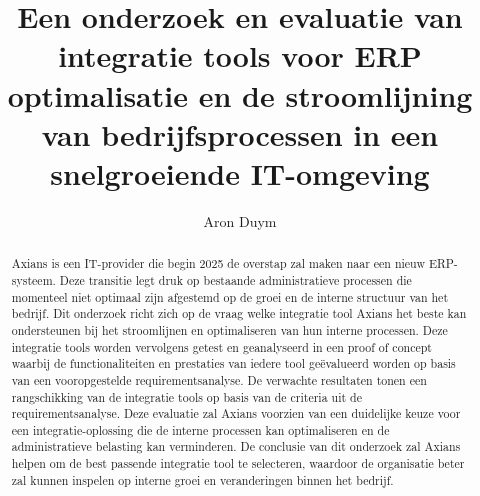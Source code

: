 \documentclass[a0,portrait]{hogent-poster}
\title{Een onderzoek en evaluatie van integratie tools voor ERP optimalisatie en de stroomlijning van bedrijfsprocessen in een snelgroeiende IT-omgeving}
\author{Aron Duym}
\begin{document}
\maketitle

\begin{abstract}
Axians is een IT-provider die begin 2025 de overstap zal maken naar een nieuw ERP-systeem. Deze transitie legt druk op bestaande administratieve processen die momenteel niet optimaal zijn afgestemd op de groei en de interne structuur van het bedrijf. Dit onderzoek richt zich op de vraag welke integratie tool Axians het beste kan ondersteunen bij het stroomlijnen en optimaliseren van hun interne processen. Deze integratie tools worden vervolgens getest en geanalyseerd in een proof of concept waarbij de functionaliteiten en prestaties van iedere tool geëvalueerd worden op basis van een vooropgestelde requirementsanalyse. De verwachte resultaten tonen een rangschikking van de integratie tools op basis van de criteria uit de requirementsanalyse. Deze evaluatie zal Axians voorzien van een duidelijke keuze voor een integratie-oplossing die de interne processen kan optimaliseren en de administratieve belasting kan verminderen. De conclusie van dit onderzoek zal Axians helpen om de best passende integratie tool te selecteren, waardoor de organisatie beter zal kunnen inspelen op interne groei en veranderingen binnen het bedrijf.
\end{abstract}
\end{document}
